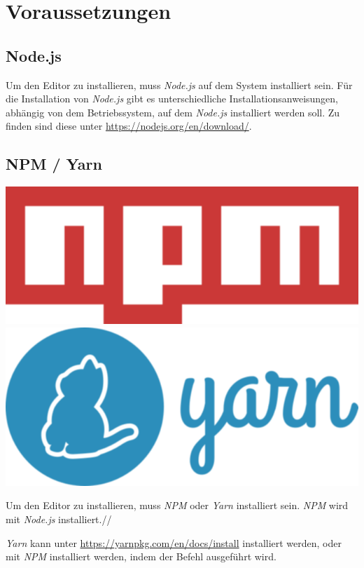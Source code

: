 \section{Voraussetzungen}\label{sec:voraussetzungen}

\subsection{Node.js}\label{subsec:node.js2}

Um den Editor zu installieren, muss \emph{Node.js} auf dem System installiert sein.
Für die Installation von \emph{Node.js} gibt es unterschiedliche Installationsanweisungen, abhängig von dem Betriebssystem, auf dem \emph{Node.js} installiert werden soll.
Zu finden sind diese unter \url{https://nodejs.org/en/download/}.

\subsection{NPM / Yarn}\label{subsec:npm-/-yarn}

\includegraphics[scale=0.1]{assets/npm}
\includegraphics[scale=0.1]{assets/yarn}

Um den Editor zu installieren, muss \emph{NPM} oder \emph{Yarn} installiert sein.
\emph{NPM} wird mit \emph{Node.js} installiert.//

\emph{Yarn} kann unter \url{https://yarnpkg.com/en/docs/install} installiert werden, oder mit \emph{NPM} installiert werden, indem der Befehl  ausgeführt wird.

